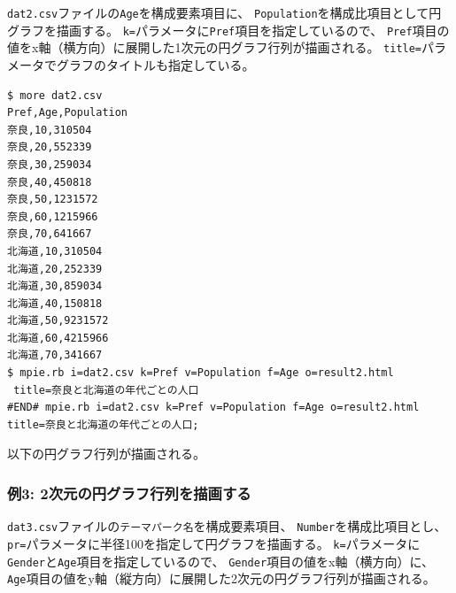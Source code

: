\verb|dat2.csv|ファイルの\verb|Age|を構成要素項目に、
\verb|Population|を構成比項目として円グラフを描画する。
\verb|k=|パラメータに\verb|Pref|項目を指定しているので、
\verb|Pref|項目の値をx軸（横方向）に展開した1次元の円グラフ行列が描画される。
\verb|title=|パラメータでグラフのタイトルも指定している。

\begin{Verbatim}[baselinestretch=0.5,frame=single]
$ more dat2.csv
Pref,Age,Population
奈良,10,310504
奈良,20,552339
奈良,30,259034
奈良,40,450818
奈良,50,1231572
奈良,60,1215966
奈良,70,641667
北海道,10,310504
北海道,20,252339
北海道,30,859034
北海道,40,150818
北海道,50,9231572
北海道,60,4215966
北海道,70,341667
$ mpie.rb i=dat2.csv k=Pref v=Population f=Age o=result2.html
 title=奈良と北海道の年代ごとの人口
#END# mpie.rb i=dat2.csv k=Pref v=Population f=Age o=result2.html 
title=奈良と北海道の年代ごとの人口;
\end{Verbatim}

以下の円グラフ行列が描画される。

\begin{flushleft}
\end{flushleft}

\subsubsection*{例3: 2次元の円グラフ行列を描画する}
\verb|dat3.csv|ファイルの\verb|テーマパーク名|を構成要素項目、
\verb|Number|を構成比項目とし、\verb|pr=|パラメータに半径100を指定して円グラフを描画する。
\verb|k=|パラメータに\verb|Gender|と\verb|Age|項目を指定しているので、
\verb|Gender|項目の値をx軸（横方向）に、
\verb|Age|項目の値をy軸（縦方向）に展開した2次元の円グラフ行列が描画される。

